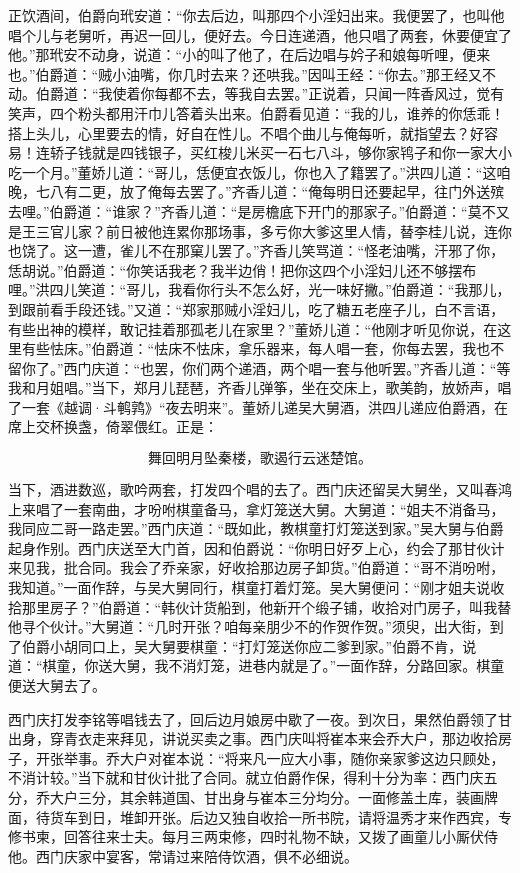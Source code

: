 正饮酒间，伯爵向玳安道：“你去后边，叫那四个小淫妇出来。我便罢了，也叫他唱个儿与老舅听，再迟一回儿，便好去。今日连递酒，他只唱了两套，休要便宜了他。”那玳安不动身，说道：“小的叫了他了，在后边唱与妗子和娘每听哩，便来也。”伯爵道：“贼小油嘴，你几时去来？还哄我。”因叫王经：“你去。”那王经又不动。伯爵道：“我使着你每都不去，等我自去罢。”正说着，只闻一阵香风过，觉有笑声，四个粉头都用汗巾儿答着头出来。伯爵看见道：“我的儿，谁养的你恁乖！搭上头儿，心里要去的情，好自在性儿。不唱个曲儿与俺每听，就指望去？好容易！连轿子钱就是四钱银子，买红梭儿米买一石七八斗，够你家鸨子和你一家大小吃一个月。”董娇儿道：“哥儿，恁便宜衣饭儿，你也入了籍罢了。”洪四儿道：“这咱晚，七八有二更，放了俺每去罢了。”齐香儿道：“俺每明日还要起早，往门外送殡去哩。”伯爵道：“谁家？”齐香儿道：“是房檐底下开门的那家子。”伯爵道：“莫不又是王三官儿家？前日被他连累你那场事，多亏你大爹这里人情，替李桂儿说，连你也饶了。这一遭，雀儿不在那窠儿罢了。”齐香儿笑骂道：“怪老油嘴，汗邪了你，恁胡说。”伯爵道：“你笑话我老？我半边俏！把你这四个小淫妇儿还不够摆布哩。”洪四儿笑道：“哥儿，我看你行头不怎么好，光一味好撇。”伯爵道：“我那儿，到跟前看手段还钱。”又道：“郑家那贼小淫妇儿，吃了糖五老座子儿，白不言语，有些出神的模样，敢记挂着那孤老儿在家里？”董娇儿道：“他刚才听见你说，在这里有些怯床。”伯爵道：“怯床不怯床，拿乐器来，每人唱一套，你每去罢，我也不留你了。”西门庆道：“也罢，你们两个递酒，两个唱一套与他听罢。”齐香儿道：“等我和月姐唱。”当下，郑月儿琵琶，齐香儿弹筝，坐在交床上，歌美韵，放娇声，唱了一套《越调·斗鹌鹑》“夜去明来”。董娇儿递吴大舅酒，洪四儿递应伯爵酒，在席上交杯换盏，倚翠偎红。正是：

\[
舞回明月坠秦楼，歌遏行云迷楚馆。
\]

当下，酒进数巡，歌吟两套，打发四个唱的去了。西门庆还留吴大舅坐，又叫春鸿上来唱了一套南曲，才吩咐棋童备马，拿灯笼送大舅。大舅道：“姐夫不消备马，我同应二哥一路走罢。”西门庆道：“既如此，教棋童打灯笼送到家。”吴大舅与伯爵起身作别。西门庆送至大门首，因和伯爵说：“你明日好歹上心，约会了那甘伙计来见我，批合同。我会了乔亲家，好收拾那边房子卸货。”伯爵道：“哥不消吩咐，我知道。”一面作辞，与吴大舅同行，棋童打着灯笼。吴大舅便问：“刚才姐夫说收拾那里房子？”伯爵道：“韩伙计货船到，他新开个缎子铺，收拾对门房子，叫我替他寻个伙计。”大舅道：“几时开张？咱每亲朋少不的作贺作贺。”须臾，出大街，到了伯爵小胡同口上，吴大舅要棋童：“打灯笼送你应二爹到家。”伯爵不肯，说道：“棋童，你送大舅，我不消灯笼，进巷内就是了。”一面作辞，分路回家。棋童便送大舅去了。

西门庆打发李铭等唱钱去了，回后边月娘房中歇了一夜。到次日，果然伯爵领了甘出身，穿青衣走来拜见，讲说买卖之事。西门庆叫将崔本来会乔大户，那边收拾房子，开张举事。乔大户对崔本说：“将来凡一应大小事，随你亲家爹这边只顾处，不消计较。”当下就和甘伙计批了合同。就立伯爵作保，得利十分为率：西门庆五分，乔大户三分，其余韩道国、甘出身与崔本三分均分。一面修盖土库，装画牌面，待货车到日，堆卸开张。后边又独自收拾一所书院，请将温秀才来作西宾，专修书柬，回答往来士夫。每月三两束修，四时礼物不缺，又拨了画童儿小厮伏侍他。西门庆家中宴客，常请过来陪侍饮酒，俱不必细说。

